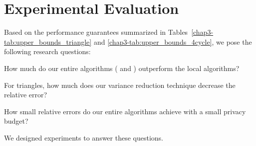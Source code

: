 \section{Experimental Evaluation}
\label{chap3-sec:experiments}
Based on the performance guarantees summarized in Tables~\ref{chap3-tab:upper_bounds_triangle} and \ref{chap3-tab:upper_bounds_4cycle}, we pose the following research questions: 

\begin{description}[leftmargin=8.75mm]
    \item[RQ1.] 
    How much do our entire algorithms (\AlgWSTriVR{} and \AlgWSCyc{}) outperform the local algorithms?
    \item[RQ2.] 
    For triangles, how much does our variance reduction technique decrease the relative error?
    \item[RQ3.] 
    How small relative errors do our entire algorithms 
    achieve with a small privacy budget?
\end{description}
We designed experiments to answer these questions. 

